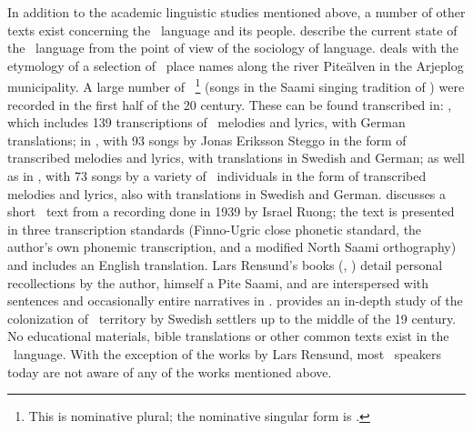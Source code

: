 In addition to the academic linguistic studies mentioned above, a number of other texts exist concerning the \PS\ language and its people. \citet{ValijarviWilbur2011} describe the current state of the \PS\ language from the  point of view of the sociology of language. \citet{sjaggo2010a} deals with the etymology of a selection of \PS\ place names along the river Piteälven in the Arjeplog municipality. 
A large number of \PS\ \footnote{This is nominative plural; the nominative singular form is .} 
(songs in the Saami singing tradition of ) were recorded in the first half of the 20 century. These can be found transcribed in: 
\citet{tiren1942a}, which includes 139 transcriptions of \PS\ melodies and lyrics, with German translations; 
in \citet{grundstroem1958a}, with 93 songs by Jonas Eriksson Steggo in the form of transcribed melodies and lyrics, with translations in Swedish and German; 
as well as in \citet{grundstroem1963a}, with 73 songs by a variety of \PS\ individuals in the form of transcribed melodies and lyrics, also with translations in Swedish and German.
\citet{wickman1964} discusses a short \PS\ text from a recording done in 1939 by Israel Ruong; the text is presented in three transcription standards (Finno-Ugric close phonetic standard, the author’s own phonemic transcription, and a modified North Saami orthography) and includes an English translation. 
Lars Rensund’s books (\citeyear{Rensund1982}, \citeyear{Rensund1986}) detail personal recollections by the author, himself a Pite Saami, and are interspersed with sentences and occasionally  entire narratives in \PS. \citet{bylund1956} provides an in-depth study of the colonization of \PS\ territory by Swedish settlers up to the middle of the 19 century. 
No educational materials, bible translations or other common texts exist in the \PS\ language. With the exception of the works by Lars Rensund, most \PS\ speakers today are not aware of any of the works mentioned above. 



